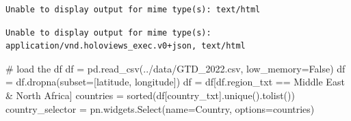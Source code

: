 \documentclass[
  letterpaper,
  DIV=11,
  numbers=noendperiod]{scrreprt}
\newenvironment{Shaded}{\begin{snugshade}}{\end{snugshade}}
\newcommand{\BuiltInTok}[1]{\textcolor[rgb]{0.00,0.23,0.31}{#1}}
\newcommand{\CommentTok}[1]{\textcolor[rgb]{0.37,0.37,0.37}{#1}}
\newcommand{\NormalTok}[1]{\textcolor[rgb]{0.00,0.23,0.31}{#1}}
\newcommand{\OperatorTok}[1]{\textcolor[rgb]{0.37,0.37,0.37}{#1}}
\newcommand{\StringTok}[1]{\textcolor[rgb]{0.13,0.47,0.30}{#1}}
\newcommand{\VariableTok}[1]{\textcolor[rgb]{0.07,0.07,0.07}{#1}}
\begin{document}
\begin{verbatim}
Unable to display output for mime type(s): text/html
\end{verbatim}

\begin{verbatim}
Unable to display output for mime type(s): application/vnd.holoviews_exec.v0+json, text/html
\end{verbatim}

\begin{Shaded}
\begin{Highlighting}[]
\CommentTok{\# load the df}
\NormalTok{df }\OperatorTok{=}\NormalTok{ pd.read\_csv(}\StringTok{\textquotesingle{}../data/GTD\_2022.csv\textquotesingle{}}\NormalTok{, low\_memory}\OperatorTok{=}\VariableTok{False}\NormalTok{)}
\NormalTok{df }\OperatorTok{=}\NormalTok{ df.dropna(subset}\OperatorTok{=}\NormalTok{[}\StringTok{\textquotesingle{}latitude\textquotesingle{}}\NormalTok{, }\StringTok{\textquotesingle{}longitude\textquotesingle{}}\NormalTok{])}
\NormalTok{df }\OperatorTok{=}\NormalTok{ df[df.region\_txt }\OperatorTok{==} \StringTok{\textquotesingle{}Middle East \& North Africa\textquotesingle{}}\NormalTok{]}
\NormalTok{countries }\OperatorTok{=} \BuiltInTok{sorted}\NormalTok{(df[}\StringTok{\textquotesingle{}country\_txt\textquotesingle{}}\NormalTok{].unique().tolist())}
\NormalTok{country\_selector }\OperatorTok{=}\NormalTok{ pn.widgets.Select(name}\OperatorTok{=}\StringTok{\textquotesingle{}Country\textquotesingle{}}\NormalTok{, options}\OperatorTok{=}\NormalTok{countries)}
\end{Highlighting}
\end{Shaded}
\end{document}
